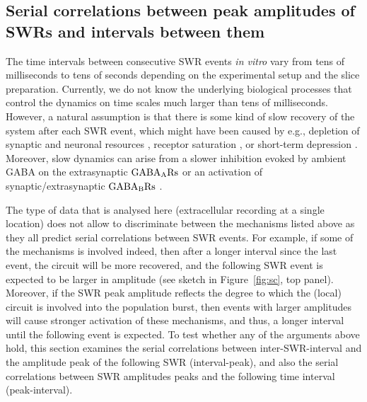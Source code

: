   \subsection{Serial correlations between peak amplitudes of SWRs and intervals between them}
    \label{sec:swr_amp-int}
    The time intervals between consecutive SWR events \textit{in vitro} vary from
    tens of milliseconds to tens of seconds depending on the experimental setup
    and the slice preparation. Currently, we do not know the underlying
    biological processes that control the dynamics on time scales much larger
    than tens of milliseconds. However, a natural assumption is that there is
    some kind of slow recovery of the system after each SWR event, which might
    have been caused by e.g., depletion of synaptic and neuronal resources
    \citep{Cohen2004, Jones2007}, receptor saturation \citep{Trussell1993}, or
    short-term depression \citep{Romani2015, Kohus2016}. Moreover, slow
    dynamics can arise from a slower inhibition evoked by ambient GABA on the
    extrasynaptic $\rm GABA_ARs$ \citep{Brown1978, Ben1994} or an activation of
    synaptic/extrasynaptic $\rm GABA_BRs$ \citep{Scanziani2000, Hollnagel2014,
    Lang2014}. 
  
    The type of data that is analysed here (extracellular recording at a single
    location) does not allow to discriminate between the mechanisms listed
    above as they all predict serial correlations between SWR events. For
    example, if some of the mechanisms is involved indeed, then after a longer
    interval since the last event, the circuit will be more recovered, and the
    following SWR event is expected to be larger in amplitude (see sketch in
    Figure~\ref{fig:sc}, top panel). Moreover, if the SWR peak amplitude
    reflects the degree to which the (local) circuit is involved into the
    population burst, then events with larger amplitudes will cause stronger
    activation of these mechanisms, and thus, a longer interval until the
    following event is expected. To test whether any of the arguments above
    hold, this section examines the serial correlations between
    inter-SWR-interval and the amplitude peak of the following SWR
    (interval-peak), and also the serial correlations between SWR amplitudes
    peaks and the following time interval (peak-interval).

